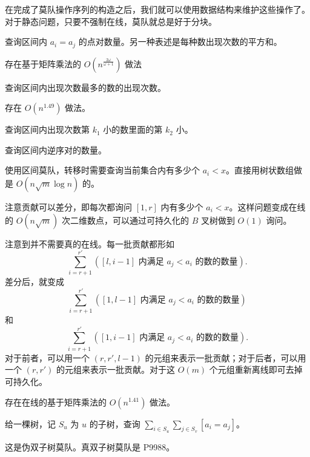 在完成了莫队操作序列的构造之后，我们就可以使用数据结构来维护这些操作了。对于静态问题，只要不强制在线，莫队就总是好于分块。

\begin{example}[小 Z 的袜子]
    查询区间内 $a_i=a_j$ 的点对数量。另一种表述是每种数出现次数的平方和。
\end{example}
\begin{remark}
    存在基于矩阵乘法的 $O(n^{\frac{2\omega}{\omega+1}})$ 做法
\end{remark}

\begin{example}[区间众数]
    查询区间内出现次数最多的数的出现次数。
\end{example}
\begin{remark}
    存在 $O(n^{1.49})$ 做法。
\end{remark}

\begin{example}[T142605]
    查询区间内出现次数第 $k_1$ 小的数里面的第 $k_2$ 小。
\end{example}

\begin{example}[区间逆序对]
    查询区间内逆序对的数量。
\end{example}
\begin{solution}
    使用区间莫队，转移时需要查询当前集合内有多少个 $a_i<x$。直接用树状数组做是 $O(n\sqrt{m}\log n)$ 的。

    注意贡献可以差分，即每次都询问 $[1,r]$ 内有多少个 $a_i<x$。这样问题变成在线的 $O(n\sqrt{m})$ 次二维数点，可以通过可持久化的 $B$ 叉树做到 $O(1)$ 询问。

    注意到并不需要真的在线。每一批贡献都形如
    $$
    \sum_{i=r+1}^{r'}([l,i-1]\text{ 内满足 }a_j<a_i\text{ 的数的数量}).
    $$
    差分后，就变成
    $$
    \sum_{i=r+1}^{r'}([1,l-1]\text{ 内满足 }a_j<a_i\text{ 的数的数量})
    $$
    和
    $$
    \sum_{i=r+1}^{r'}([1,i-1]\text{ 内满足 }a_j<a_i\text{ 的数的数量}).
    $$
    对于前者，可以用一个 $(r,r',l-1)$ 的元组来表示一批贡献；对于后者，可以用一个 $(r,r')$ 的元组来表示一批贡献。对于这 $O(m)$ 个元组重新离线即可去掉可持久化。
\end{solution}
\begin{remark}
    存在在线的基于矩阵乘法的 $O(n^{1.41})$ 做法。
\end{remark}

\begin{example}[P4869]
    给一棵树，记 $S_u$ 为 $u$ 的子树，查询 $\sum_{i\in S_u}\sum_{j\in S_v}[a_i=a_j]$。
\end{example}
\begin{remark}
    这是伪双子树莫队。真双子树莫队是 P9988。
\end{remark}

